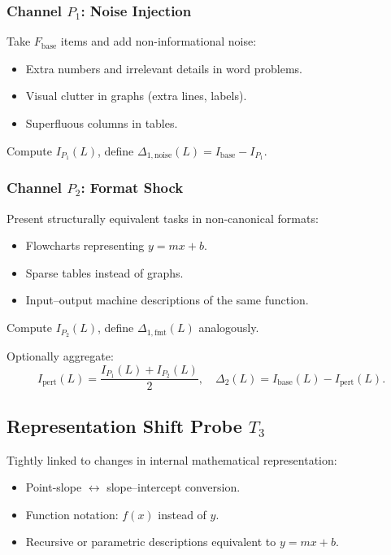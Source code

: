 \documentclass[11pt]{article}
\begin{document}
\subsubsection{Channel $P_1$: Noise Injection}

Take $F_{\text{base}}$ items and add non-informational noise:
\begin{itemize}[itemsep=3pt]
  \item Extra numbers and irrelevant details in word problems.
  \item Visual clutter in graphs (extra lines, labels).
  \item Superfluous columns in tables.
\end{itemize}
Compute $I_{P_1}(L)$, define $\Delta_{1,\text{noise}}(L) = I_{\text{base}} - I_{P_1}$.

\subsubsection{Channel $P_2$: Format Shock}

Present structurally equivalent tasks in non-canonical formats:
\begin{itemize}[itemsep=3pt]
  \item Flowcharts representing $y = mx + b$.
  \item Sparse tables instead of graphs.
  \item Input–output machine descriptions of the same function.
\end{itemize}
Compute $I_{P_2}(L)$, define $\Delta_{1,\text{fmt}}(L)$ analogously.

Optionally aggregate:
\[
I_{\text{pert}}(L) = \frac{I_{P_1}(L) + I_{P_2}(L)}{2},\quad \Delta_2(L) = I_{\text{base}}(L) - I_{\text{pert}}(L).
\]

\subsection{Representation Shift Probe $T_3$}

Tightly linked to changes in internal mathematical representation:

\begin{itemize}[itemsep=3pt]
  \item Point-slope $\leftrightarrow$ slope–intercept conversion.
  \item Function notation: $f(x)$ instead of $y$.
  \item Recursive or parametric descriptions equivalent to $y=mx+b$.
\end{itemize}
\end{document}
